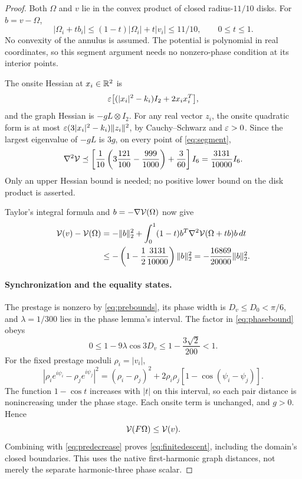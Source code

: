 \begin{proof}
Both \(\Omega\) and \(v\) lie in the convex product of closed radius-\(11/10\) disks. For \(b=v-\Omega\),
\begin{equation}
|\Omega_i+tb_i|
\le(1-t)|\Omega_i|+t|v_i|\le11/10,\qquad 0\le t\le1.
\label{eq:segment}
\end{equation}
No convexity of the annulus is assumed. The potential is polynomial in real coordinates, so this segment argument needs no nonzero-phase condition at its interior points.

The onsite Hessian at \(x_i\in\mathbb R^2\) is
\begin{equation}
\varepsilon\big[(|x_i|^2-k_i)I_2+2x_ix_i^T\big],
\label{eq:onsitehessian}
\end{equation}
and the graph Hessian is \(-gL\otimes I_2\). For any real vector \(z_i\), the onsite quadratic form is at most
\(\varepsilon(3|x_i|^2-k_i)\|z_i\|^2\), by Cauchy--Schwarz and \(\varepsilon>0\). Since the largest eigenvalue of \(-gL\) is \(3g\), on every point of \eqref{eq:segment},
\begin{equation}
\nabla^2\mathcal V\preceq
\left[\frac1{10}\left(3\frac{121}{100}-\frac{999}{1000}\right)
+\frac3{60}\right]I_6
=\frac{3131}{10000}I_6.
\label{eq:curvature}
\end{equation}
Only an upper Hessian bound is needed; no positive lower bound on the disk product is asserted.

Taylor's integral formula and \(b=-\nabla\mathcal V(\Omega)\) now give
\begin{align}
\mathcal V(v)-\mathcal V(\Omega)
&=-\|b\|_2^2+
\int_0^1(1-t)b^T\nabla^2\mathcal V(\Omega+tb)b\,dt\notag\\
&\le-\left(1-\frac12\frac{3131}{10000}\right)\|b\|_2^2
=-\frac{16869}{20000}\|b\|_2^2.
\label{eq:predecrease}
\end{align}

\paragraph{Synchronization and the equality states.}
The prestage is nonzero by \eqref{eq:prebounds}, its phase width is \(D_v\le D_0<\pi/6\), and \(\lambda=1/300\) lies in the phase lemma's interval. The factor in \eqref{eq:phasebound} obeys
\[
0\le1-9\lambda\cos3D_v
\le1-\frac{3\sqrt2}{200}<1.
\]
For the fixed prestage moduli \(\rho_i=|v_i|\),
\begin{equation}
|\rho_i e^{i\psi_i}-\rho_j e^{i\psi_j}|^2
=(\rho_i-\rho_j)^2+
2\rho_i\rho_j[1-\cos(\psi_i-\psi_j)].
\label{eq:pairdistance}
\end{equation}
The function \(1-\cos t\) increases with \(|t|\) on this interval, so each pair distance is nonincreasing under the phase stage. Each onsite term is unchanged, and \(g>0\). Hence
\begin{equation}
\mathcal V(F\Omega)\le\mathcal V(v).
\label{eq:syncdecrease}
\end{equation}
Combining with \eqref{eq:predecrease} proves \eqref{eq:finitedescent}, including the domain's closed boundaries. This uses the native first-harmonic graph distances, not merely the separate harmonic-three phase scalar.


\end{proof}
